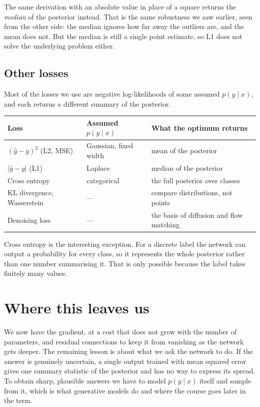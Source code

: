 \documentclass[11pt]{article}
\newcommand{\yhat}{\hat{y}}
\begin{document}
\noindent
The same derivation with an absolute value in place of a square returns the
\emph{median} of the posterior instead. That is the same robustness we saw earlier, seen
from the other side: the median ignores how far away the outliers are, and the mean does
not. But the median is still a single point estimate, so L1 does not solve the underlying
problem either.

\subsection*{Other losses}

Most of the losses we use are negative log-likelihoods of some assumed $p(y \mid x)$, and
each returns a different summary of the posterior.

\begin{center}
\small
\begin{tabular}{@{}lll@{}}
\toprule
\textbf{Loss} & \textbf{Assumed $p(y\mid x)$} & \textbf{What the optimum returns} \\
\midrule
$(\yhat - y)^{2}$ \; (L2, MSE) & Gaussian, fixed width & mean of the posterior \\
$|\yhat - y|$ \; (L1) & Laplace & median of the posterior \\
Cross entropy & categorical & the full posterior over classes \\
KL divergence, Wasserstein & --- & compare distributions, not points \\
Denoising loss & --- & the basis of diffusion and flow matching \\
\bottomrule
\end{tabular}
\end{center}

\noindent
Cross entropy is the interesting exception. For a discrete label the network can output a
probability for every class, so it represents the whole posterior rather than one number
summarising it. That is only possible because the label takes finitely many values.

\section*{Where this leaves us}

We now have the gradient, at a cost that does not grow with the number of parameters, and
residual connections to keep it from vanishing as the network gets deeper. The remaining
lesson is about what we ask the network to do. If the answer is genuinely uncertain, a
single output trained with mean squared error gives one summary statistic of the posterior
and has no way to express its spread. To obtain sharp, plausible answers we have to model
$p(y \mid x)$ itself and sample from it, which is what generative models do and where the
course goes later in the term.
\end{document}
